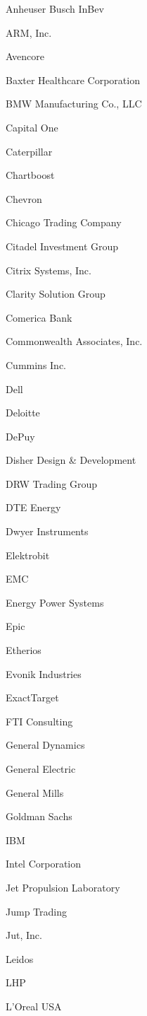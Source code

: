 \documentclass[twoside]{article}
\begin{document}
\begin{center}
\begin{multicols}{5}
\begin{FlushLeft}
\begin{compactitem}
\item Anheuser Busch InBev
\item ARM, Inc.
\item Avencore
\item Baxter Healthcare Corporation
\item BMW Manufacturing Co., LLC
\item Capital One
\item Caterpillar
\item Chartboost
\item Chevron
\item Chicago Trading Company
\item Citadel Investment Group
\item Citrix Systems, Inc.
\item Clarity Solution Group
\item Comerica Bank
\item Commonwealth Associates, Inc.
\item Cummins Inc.
\item Dell
\item Deloitte
\item DePuy
\item Disher Design \& Development
\item DRW Trading Group
\item DTE Energy
\item Dwyer Instruments
\item Elektrobit
\item EMC
\item Energy Power Systems
\item Epic
\item Etherios
\item Evonik Industries
\item ExactTarget
\item FTI Consulting
\item General Dynamics
\item General Electric
\item General Mills
\item Goldman Sachs
\item IBM
\item Intel Corporation
\item Jet Propulsion Laboratory
\item Jump Trading
\item Jut, Inc.
\item Leidos
\item LHP
\item L'Oreal USA

\end{compactitem}
\end{FlushLeft}
\end{multicols}
\end{center}
\end{document}
